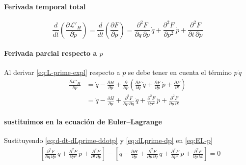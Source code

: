 \documentclass{article}
\begin{document}
\paragraph{Ferivada temporal total}

\begin{equation}
  \frac{d}{dt}
  \left(
    \frac{\partial \mathcal{L}'_{H}}{\partial \dot p}
  \right)
  =
  \frac{d}{dt}\left(\frac{\partial F}{\partial p}\right)
  =
  \frac{\partial^{2}F}{\partial q\,\partial p}\,\dot q
  + \frac{\partial^{2}F}{\partial p^{2}}\,\dot p
  + \frac{\partial^{2}F}{\partial t\,\partial p}
  \label{eq:d-dt-dLprime-ddotp}
\end{equation}

\paragraph{Ferivada parcial respecto a $p$}

Al derivar \eqref{eq:L-prime-expl} respecto a $p$ se debe tener en cuenta el
término $p\,\dot q$
\begin{equation}
\begin{split}
  \frac{\partial \mathcal{L}'_{H}}{\partial p}
  &=
  \dot q
  - \frac{\partial H}{\partial p}
  + \frac{\partial}{\partial p}
  \left(
    \frac{\partial F}{\partial q}\,\dot q
    + \frac{\partial F}{\partial p}\,\dot p
    + \frac{\partial F}{\partial t}
  \right)
  \\
  &=
  \dot q
  - \frac{\partial H}{\partial p}
  + \frac{\partial^{2}F}{\partial p\,\partial q}\,\dot q
  + \frac{\partial^{2}F}{\partial p^{2}}\,\dot p
  + \frac{\partial^{2}F}{\partial p\,\partial t}
\end{split}
\label{eq:dLprime-dp}
\end{equation}

\paragraph{sustituimos en la ecuación de Euler–Lagrange}

Sustituyendo \eqref{eq:d-dt-dLprime-ddotp} y \eqref{eq:dLprime-dp} en
\eqref{eq:EL-p}
\begin{equation}
\begin{split}
  &\left[
    \frac{\partial^{2}F}{\partial q\,\partial p}\,\dot q
    + \frac{\partial^{2}F}{\partial p^{2}}\,\dot p
    + \frac{\partial^{2}F}{\partial t\,\partial p}
  \right]
  -
  \left[
    \dot q
    - \frac{\partial H}{\partial p}
    + \frac{\partial^{2}F}{\partial p\,\partial q}\,\dot q
    + \frac{\partial^{2}F}{\partial p^{2}}\,\dot p
    + \frac{\partial^{2}F}{\partial p\,\partial t}
  \right]
  = 0
\end{split}
\end{equation}
\end{document}

